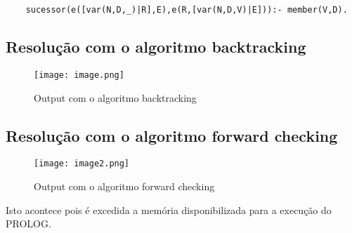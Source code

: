 \documentclass{article}
\begin{document}
\begin{verbatim}
    sucessor(e([var(N,D,_)|R],E),e(R,[var(N,D,V)|E])):- member(V,D).
\end{verbatim}

\subsection{Resolução com o algoritmo backtracking}

\begin{figure}[h]
    \centering
    \texttt{[image: image.png]}
    \caption{Output com o algoritmo backtracking}
    \label{fig:Resolução com o algoritmo backtracking}
\end{figure}

\subsection{Resolução com o algoritmo forward checking}

\begin{figure}[h]
    \centering
    \texttt{[image: image2.png]}
    \caption{Output com o algoritmo forward checking}
    \label{fig:Resolução com o algoritmo forwward checking}
\end{figure}

Isto acontece pois é excedida a memória disponibilizada para a execução do PROLOG.
\end{document}
